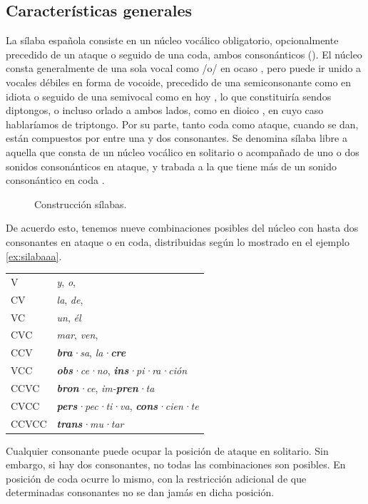 \subsection{Características generales}
La sílaba española consiste en un núcleo vocálico obligatorio, opcionalmente precedido de un ataque o seguido de una coda, ambos consonánticos (). El núcleo consta generalmente de una sola vocal como /o/ en \textlangle{}ocaso\textrangle{} \ipa{[o.ˈka.so]}, pero puede ir unido a vocales débiles en forma de vocoide, precedido de una semiconsonante como en \textlangle{}idiota\textrangle{} \ipa{[i.ˈðjo.ta]} o seguido de una semivocal como en \textlangle{}hoy\textrangle{} \ipa{[oi̯]}, lo que constituiría sendos diptongos, o incluso orlado a ambos lados, como en \textlangle{}dioico\textrangle{} \ipa{[ˈðjoi̯.ko]}, en cuyo caso hablaríamos de triptongo. Por su parte, tanto coda como ataque, cuando se dan, están compuestos por entre una y dos consonantes. Se denomina sílaba libre a aquella que consta de un núcleo vocálico en solitario o acompañado de uno o dos sonidos consonánticos en ataque, y trabada a la que tiene más de un sonido consonántico en coda \parencite[46-47]{navarrotomas1946}.

\begin{figure}[!ht]
	\centering

\caption{Construcción sílabas.}
\label{fig:silabeo}
\end{figure}

De acuerdo esto, tenemos nueve combinaciones posibles del núcleo con hasta dos consonantes en ataque o en coda, distribuidas según lo mostrado en el ejemplo \ref{ex:silabaaa}. 
\begin{exe}\ex\label{ex:silabaaa}
\begin{tabular}{ l l }
	V & \textit{y}, \textit{o},  \\ 
	CV & \textit{la}, \textit{de},  \\
	VC & \textit{un}, \textit{él}  \\ 
	CVC & \textit{mar}, \textit{ven}, \\ 
	CCV & \textit{\textbf{bra}·sa}, \textit{la·\textbf{cre}}  \\
	VCC & \textit{\textbf{obs}·ce·no},  \textit{\textbf{ins}·pi·ra·ción} \\
	CCVC & \textit{\textbf{bron}·ce}, \textit{im-\textbf{pren}·ta} \\ 
	CVCC & \textit{\textbf{pers}·pec·ti·va}, \textit{\textbf{cons}·cien·te}  \\ 
	CCVCC & \textit{\textbf{trans}·mu·tar}
\end{tabular}
\end{exe}
Cualquier consonante puede ocupar la posición de ataque en solitario. Sin embargo, si hay dos consonantes, no todas las combinaciones son posibles. En posición de coda ocurre lo mismo, con la restricción adicional de que determinadas consonantes no se dan jamás en dicha posición.

